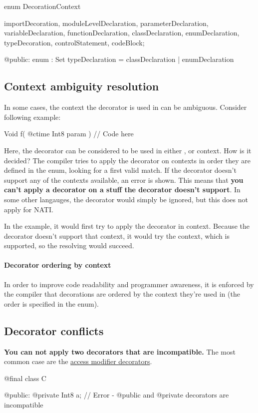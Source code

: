 \begin{code}
enum DecorationContext {
	importDecoration,
	moduleLevelDeclaration,
	parameterDeclaration,
	variableDeclaration,
	functionDeclaration,
	classDeclaration,
	enumDeclaration,
	typeDecoration,
	controlStatement,
	codeBlock;
	
@public:
	enum : Set {
		typeDeclaration = classDeclaration | enumDeclaration	
	}
}
\end{code} \label{enum:DecorationContext}

\subsection{Context ambiguity resolution} In some cases, the context the decorator is used in can be ambiguous. Consider following example:
\begin{code}
Void f( @ctime Int8 param ) {
	// Code here
}
\end{code}

Here, the  decorator can be considered to be used in either ,  or  context. How is it decided? The compiler tries to apply the decorator on contexts in order they are defined in the  enum, looking for a first valid match. If the decorator doesn't support any of the contexts available, an error is shown. This means that \textbf{you can't apply a decorator on a stuff the decorator doesn't support}. In some other langauges, the decorator would simply be ignored, but this does not apply for NATI.

In the example, it would first try to apply the decorator in   context. Because the  decorator doesn't support that context, it would try the   context, which is supported, so the resolving would succeed.

\paragraph{Decorator ordering by context} In order to improve code readability and programmer awareness, it is enforced by the compiler that decorations are ordered by the context they're used in (the order is specified in the  enum).

\subsection{Decorator conflicts}
\textbf{You can not apply two decorators that are incompatible.} The most common case are the \hyperref[accessModifierDecorators]{access modifier decorators}.
\begin{code}
@final class C {

@public:
	@private Int8 a; // Error - @public and @private decorators are incompatible
	
}
\end{code}

